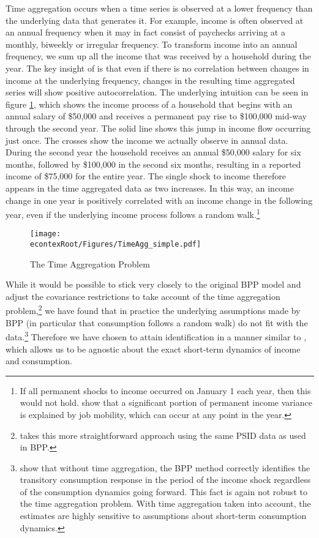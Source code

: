 \documentclass[titlepage]{\econtex}\newcommand{\texname}{ConsumptionHeterogeneity}
\begin{document}
Time aggregation occurs when a time series is observed at a lower frequency than the underlying data that generates it. For example, income is often observed at an annual frequency when it may in fact consist of paychecks arriving at a monthly, biweekly or irregular frequency. To transform income into an annual frequency, we sum up all the income that was received by a household during the year. The key insight of \cite{working_note_1960} is that even if there is no correlation between changes in income at the underlying frequency, changes in the resulting time aggregated series will show positive autocorrelation. The underlying intuition can be seen in figure \ref{fig:TimeAgg}, which shows the income process of a household that begins with an annual salary of \$50,000 and receives a permanent pay rise to \$100,000 mid-way through the second year. The solid line shows this jump in income flow occurring just once. The crosses show the income we actually observe in annual data. During the second year the household receives an annual \$50,000 salary for six months, followed by \$100,000 in the second six months, resulting in a reported income of \$75,000 for the entire year. The single shock to income therefore appears in the time aggregated data as two increases. In this way, an income change in one year is positively correlated with an income change in the following year, even if the underlying income process follows a random walk.\footnote{If all permanent shocks to income occurred on January 1 each year, then this would not hold. \cite{low_wage_2010} show that a significant portion of permanent income variance is explained by job mobility, which can occur at any point in the year.}
\begin{figure} 
	\begin{centering}
		\texttt{[image: \\econtexRoot/Figures/TimeAgg\_simple.pdf]} 
		\caption{The Time Aggregation Problem}
		\label{fig:TimeAgg}
	\end{centering}
\end{figure}

While it would be possible to stick very closely to the original BPP model and adjust the covariance restrictions to take account of the time aggregation problem,\footnote{\cite{crawley_time_2018} takes this more straightforward approach using the same PSID data as used in BPP.} we have found that in practice the underlying assumptions made by BPP (in particular that consumption follows a random walk) do not fit with the data.\footnote{\cite{kaplan_how_2010} show that without time aggregation, the BPP method correctly identifies the transitory consumption response in the period of the income shock regardless of the consumption dynamics going forward. This fact is again not robust to the time aggregation problem. With time aggregation taken into account, the estimates are highly sensitive to assumptions about short-term consumption dynamics.} Therefore we have chosen to attain identification in a manner similar to \cite{carroll_nature_1997}, which allows us to be agnostic about the exact short-term dynamics of income and consumption.
\end{document}
